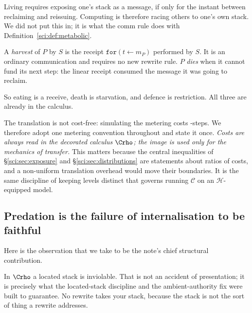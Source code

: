 \begin{remark}
\label{sci:rem:race}
Living requires exposing one's stack as a message, if only for the instant between reclaiming and
reissuing. Computing is therefore racing others to one's own stack. We did not put this in; it is
what the comm rule does with Definition~\ref{sci:def:metabolic}.
\end{remark}

\begin{definition}
\label{sci:def:harvest}
A \emph{harvest} of $P$ by $S$ is the receipt $\texttt{for}(t \leftarrow m_P)$ performed by $S$. It is
an ordinary communication and requires no new rewrite rule. $P$ \emph{dies} when it cannot fund its
next step: the linear receipt consumed the message it was going to reclaim.
\end{definition}

So eating is a receive, death is starvation, and defence is restriction. All three are already in the
calculus.

\begin{remark}\label{sci:one-ledger}
The translation is not cost-free: simulating the metering costs \rhoc-steps. We therefore adopt one
metering convention throughout and state it once. \emph{Costs are always read in the decorated
calculus $\Crho$; the image is used only for the mechanics of transfer.} This matters because the
central inequalities of \S\ref{sci:sec:exposure} and \S\ref{sci:sec:distributions} are statements about ratios
of costs, and a non-uniform translation overhead would move their boundaries. It is the same
discipline of keeping levels distinct that governs running $\mathcal{C}$ on an
$\mathcal{H}$-equipped model.
\end{remark}

\subsection{Predation is the failure of internalisation to be faithful}\label{sci:S7.3}

Here is the observation that we take to be the note's chief structural contribution.

In $\Crho$ a located stack is inviolable. That is not an accident of presentation; it is precisely
what the located-stack discipline and the ambient-authority fix were built to guarantee. No rewrite
takes your stack, because the stack is not the sort of thing a rewrite addresses.

